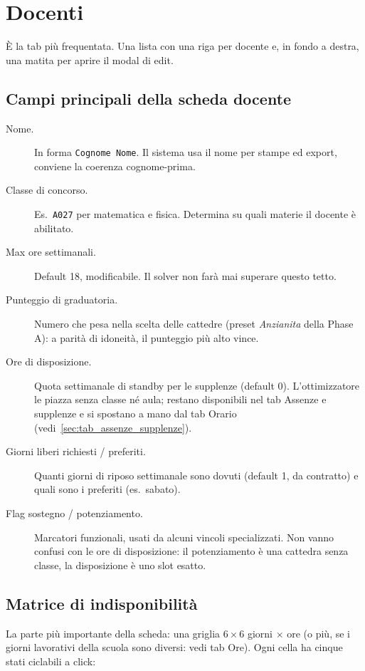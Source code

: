 \section{Docenti}
\label{sec:tab_docenti}

\`E la tab pi\`u frequentata. Una lista con una riga per docente e,
in fondo a destra, una matita per aprire il modal di edit.

\subsection{Campi principali della scheda docente}

\begin{description}
\item[Nome.] In forma \texttt{Cognome Nome}. Il sistema usa il
  nome per stampe ed export, conviene la coerenza
  cognome-prima.
\item[Classe di concorso.] Es.\ \texttt{A027} per matematica e
  fisica. Determina su quali materie il docente \`e abilitato.
\item[Max ore settimanali.] Default 18, modificabile. Il solver
  non far\`a mai superare questo tetto.
\item[Punteggio di graduatoria.] Numero che pesa nella scelta
  delle cattedre (preset \emph{Anzianita} della Phase A): a
  parit\`a di idoneit\`a, il punteggio pi\`u alto vince.
\item[Ore di disposizione.] Quota settimanale di standby per
  le supplenze (default 0). L'ottimizzatore le piazza senza
  classe n\'e aula; restano disponibili nel tab Assenze e
  supplenze e si spostano a mano dal tab Orario
  (vedi~\cref{sec:tab_assenze_supplenze}).
\item[Giorni liberi richiesti / preferiti.] Quanti giorni di
  riposo settimanale sono dovuti (default 1, da contratto) e
  quali sono i preferiti (es.\ sabato).
\item[Flag sostegno / potenziamento.] Marcatori funzionali, usati
  da alcuni vincoli specializzati. Non vanno confusi con le
  ore di disposizione: il potenziamento \`e una cattedra
  senza classe, la disposizione \`e uno slot esatto.
\end{description}

\subsection{Matrice di indisponibilit\`a}

La parte pi\`u importante della scheda: una griglia
$6\times 6$ giorni $\times$ ore (o pi\`u, se i giorni
lavorativi della scuola sono diversi: vedi tab Ore). Ogni
cella ha cinque stati ciclabili a click:

